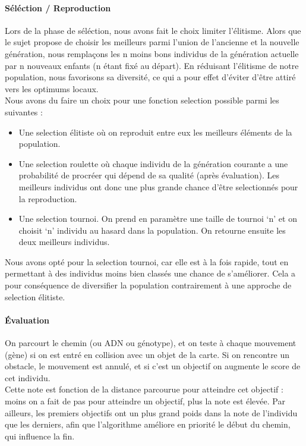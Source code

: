 \documentclass[a4paper]{article}
\begin{document}
\paragraph{Séléction / Reproduction \\}
Lors de la phase de séléction, nous avons fait le choix limiter l’élitisme. Alors que le sujet propose de choisir les meilleurs parmi l’union de l’ancienne et la nouvelle génération, nous remplaçons les n moins bons individus de la génération actuelle par n nouveaux enfants (n étant fixé au départ). En réduisant l’élitisme de notre population, nous favorisons sa diversité, ce qui a pour effet d’éviter d’être attiré vers les optimums locaux. \\
Nous avons du faire un choix pour une fonction selection possible parmi les suivantes : \\
\begin{itemize}
  \item Une selection élitiste où on reproduit entre eux les meilleurs éléments de la population.
  \item Une selection roulette où chaque individu de la génération courante a une probabilité de procréer qui dépend de sa qualité (après évaluation). Les meilleurs individus ont donc une plus grande chance d’être selectionnés pour la reproduction.
  \item Une selection tournoi. On prend en paramètre une taille de tournoi ‘n’ et on choisit ‘n’ individu au hasard dans la population. On retourne ensuite les deux meilleurs individus.
\end{itemize}
Nous avons opté pour la selection tournoi, car elle est à la fois rapide, tout en permettant à des individus moins bien classés une chance de s’améliorer. Cela a pour conséquence de diversifier la population contrairement à une approche de selection élitiste. \\

\paragraph{Évaluation \\}
On parcourt le chemin (ou ADN ou génotype), et on teste à chaque mouvement (gène) si on est entré en collision avec un objet de la carte. Si on rencontre un obstacle, le mouvement est annulé, et si c’est un objectif on augmente le score de cet individu. \\
Cette note est fonction de la distance parcourue pour atteindre cet objectif : moins on a fait de pas pour atteindre un objectif, plus la note est élevée. Par ailleurs, les premiers objectifs ont un plus grand poids dans la note de l’individu que les derniers, afin que l’algorithme améliore en priorité le début du chemin, qui influence la fin. \\
\end{document}
